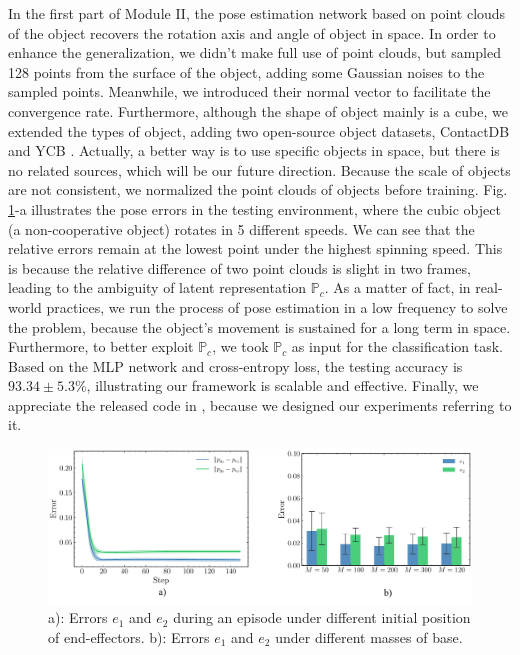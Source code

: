 \documentclass{article}
\begin{document}
In the first part of Module II, the pose estimation network based on point clouds of the object recovers the rotation axis and angle of object in space. In order to enhance the generalization, we didn't make full use of point clouds, but sampled 128 points from the surface of the object, adding some Gaussian noises to the sampled points. Meanwhile, we introduced their normal vector to facilitate the convergence rate. Furthermore, although the shape of object mainly is a cube, we extended the types of object, adding two open-source object datasets, ContactDB \cite{brahmbhatt2019contactdb} and YCB \cite{calli2015ycb}. Actually, a better way is to use specific objects in space, but there is no related sources, which will be our future direction. Because the scale of objects are not consistent, we normalized the point clouds of objects before training. Fig. \ref{fig4}-a illustrates the pose errors in the testing environment, where the cubic object (a non-cooperative object) rotates in 5 different speeds. We can see that the relative errors remain at the lowest point under the highest spinning speed. This is because the relative difference of two point clouds is slight in two frames, leading to the ambiguity of latent representation $\mathbb {P}_c$.  As a matter of fact, in real-world practices, we run the process of pose estimation in a low frequency to solve the problem, because the object's movement is sustained for a long term in space. Furthermore, to better exploit $ \mathbb {P}_c$, we took $ \mathbb {P}_c$ as input for the classification task. Based on the MLP network and cross-entropy loss, the testing accuracy is $93.34\pm 5.3\%$, illustrating our framework is scalable and effective. Finally, we appreciate the released code in \cite{huang2021generalization}, because we designed our experiments referring to it. 

\begin{figure}[t]
  \centering
  \includegraphics[width=\hsize]{figs/Fig4.pdf}
  \caption{a): Errors $e_1$ and $e_2$ during an episode under different initial position of end-effectors. b): Errors $e_1$ and $e_2$ under different masses of base.}
  \label{fig4}
\end{figure}
\end{document}
